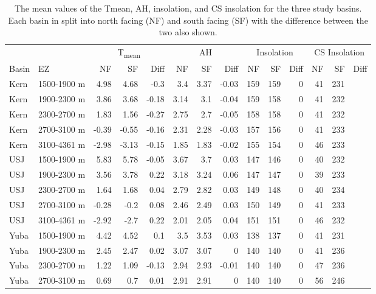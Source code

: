 \begin{table}[htbp]
\centering
\caption{The mean values of the Tmean, AH, insolation, and CS insolation for the three study basins. Each basin in split into north facing (NF) and south facing (SF) with the difference between the two also shown.}
\label{tab:met_metric_table}
\tiny %
\begin{tabular}{llrrrrrrrrrrrr}
\toprule
& & \multicolumn{3}{c}{T\textsubscript{mean}}} & \multicolumn{3}{c}{AH} & \multicolumn{3}{c}{Insolation} & \multicolumn{3}{c}{CS Insolation} \\
\cmidrule(c){3-5} \cmidrule(lr){6-8} \cmidrule(lr){9-11} \cmidrule(lr){12-14} 
Basin & EZ & NF & SF & Diff & NF & SF & Diff & NF & SF & Diff & NF & SF & Diff \\
\midrule
Kern & 1500-1900 m & 4.98 & 4.68 & -0.3 & 3.4 & 3.37 & -0.03 & 159 & 159 & 0 & 41 & 231 \\
Kern & 1900-2300 m & 3.86 & 3.68 & -0.18 & 3.14 & 3.1 & -0.04 & 159 & 158 & 0 & 41 & 232 \\
Kern & 2300-2700 m & 1.83 & 1.56 & -0.27 & 2.75 & 2.7 & -0.05 & 158 & 158 & 0 & 41 & 232 \\
Kern & 2700-3100 m & -0.39 & -0.55 & -0.16 & 2.31 & 2.28 & -0.03 & 157 & 156 & 0 & 41 & 233 \\
Kern & 3100-4361 m & -2.98 & -3.13 & -0.15 & 1.85 & 1.83 & -0.02 & 155 & 154 & 0 & 46 & 233 \\
USJ & 1500-1900 m & 5.83 & 5.78 & -0.05 & 3.67 & 3.7 & 0.03 & 147 & 146 & 0 & 40 & 232 \\
USJ & 1900-2300 m & 3.56 & 3.78 & 0.22 & 3.18 & 3.24 & 0.06 & 147 & 147 & 0 & 39 & 233 \\
USJ & 2300-2700 m & 1.64 & 1.68 & 0.04 & 2.79 & 2.82 & 0.03 & 149 & 148 & 0 & 40 & 234 \\
USJ & 2700-3100 m & -0.28 & -0.2 & 0.08 & 2.46 & 2.49 & 0.03 & 150 & 149 & 0 & 41 & 233 \\
USJ & 3100-4361 m & -2.92 & -2.7 & 0.22 & 2.01 & 2.05 & 0.04 & 151 & 151 & 0 & 46 & 232 \\
Yuba & 1500-1900 m & 4.42 & 4.52 & 0.1 & 3.5 & 3.53 & 0.03 & 138 & 137 & 0 & 41 & 231 \\
Yuba & 1900-2300 m & 2.45 & 2.47 & 0.02 & 3.07 & 3.07 & 0 & 140 & 140 & 0 & 41 & 236 \\
Yuba & 2300-2700 m & 1.22 & 1.09 & -0.13 & 2.94 & 2.93 & -0.01 & 140 & 140 & 0 & 47 & 236 \\
Yuba & 2700-3100 m & 0.69 & 0.7 & 0.01 & 2.91 & 2.91 & 0 & 140 & 140 & 0 & 56 & 246 \\
\bottomrule
\end{tabular}
\end{table}

